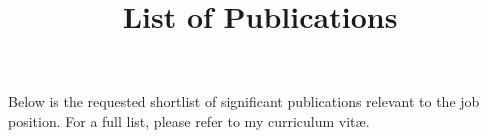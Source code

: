 \documentclass[10pt,a4paper,sans]{moderncv} %
\title{List of Publications}
\begin{document}
\makecvtitle
\vspace*{-1em}

Below is the requested shortlist of significant publications relevant to the job position. For a full list, please refer to my curriculum vit\ae{}.

\nocite{Gonski:2026jgu, CraigGroup:2026qmr, ATLAS:2024mow, Alshehri:2024wku, Ciangottini:2024vtl, ATLAS:2024qxh, 10.21468/SciPostPhysCodeb.27, Bailey:2022tdz}

\printbibliography
\end{document}
